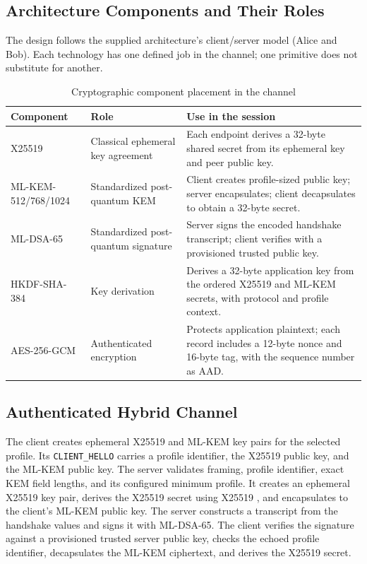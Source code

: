 \documentclass[journal]{IEEEtran}
\begin{document}
\subsection{Architecture Components and Their Roles}
The design follows the supplied architecture's client/server model (Alice and Bob). Each technology has one defined job in the channel; one primitive does not substitute for another.
\begin{table}[t]
\caption{Cryptographic component placement in the channel}
\label{tab:components}
\centering
\footnotesize
\begin{tabular}{p{}p{}p{}}
\toprule
Component & Role & Use in the session \\
\midrule
X25519 & Classical ephemeral key agreement \cite{rfc7748} & Each endpoint derives a 32-byte shared secret from its ephemeral key and peer public key. \\
ML-KEM-512/768/1024 & Standardized post-quantum KEM \cite{nist203} & Client creates profile-sized public key; server encapsulates; client decapsulates to obtain a 32-byte secret. \\
ML-DSA-65 & Standardized post-quantum signature \cite{nist204} & Server signs the encoded handshake transcript; client verifies with a provisioned trusted public key. \\
HKDF-SHA-384 & Key derivation \cite{rfc5869} & Derives a 32-byte application key from the ordered X25519 and ML-KEM secrets, with protocol and profile context. \\
AES-256-GCM & Authenticated encryption \cite{nistGcm} & Protects application plaintext; each record includes a 12-byte nonce and 16-byte tag, with the sequence number as AAD. \\
\bottomrule
\end{tabular}
\end{table}

\subsection{Authenticated Hybrid Channel}
The client creates ephemeral X25519 and ML-KEM key pairs for the selected profile. Its \texttt{CLIENT\_HELLO} carries a profile identifier, the X25519 public key, and the ML-KEM public key. The server validates framing, profile identifier, exact KEM field lengths, and its configured minimum profile. It creates an ephemeral X25519 key pair, derives the X25519 secret using X25519 \cite{rfc7748}, and encapsulates to the client's ML-KEM public key. The server constructs a transcript from the handshake values and signs it with ML-DSA-65. The client verifies the signature against a provisioned trusted server public key, checks the echoed profile identifier, decapsulates the ML-KEM ciphertext, and derives the X25519 secret.
\end{document}
